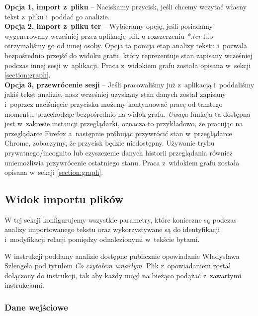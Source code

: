 \documentclass[12pt, a4paper]{article}
\begin{document}
\textbf{Opcja 1, import z~pliku} -- Naciskamy przycisk, jeśli chcemy wczytać własny tekst z~pliku i~poddać go analizie.\\

\noindent\textbf{Opcja 2, import z~pliku ter} -- Wybieramy opcję, jeśli posiadamy wygenerowany wcześniej przez aplikację plik o rozszerzeniu \textit{*.ter} lub otrzymaliśmy go od innej osoby. Opcja ta pomija etap analizy tekstu i~pozwala bezpośrednio przejść do widoku grafu, który reprezentuje stan zapisany wcześniej podczas innej sesji w~aplikacji. Praca z~widokiem grafu została opisana w~sekcji \ref{section:graph}.\\

\noindent\textbf{Opcja 3, przewrócenie sesji} -- Jeśli pracowaliśmy już z~aplikacją i~poddaliśmy jakiś tekst analizie, nasz wcześniej uzyskany stan danych został zapisany i~poprzez naciśnięcie przycisku możemy kontynuować pracę od tamtego momentu, przechodząc bezpośrednio na widok grafu. \textit{Uwaga} funkcja ta dostępna jest w~zakresie instancji przeglądarki, oznacza to przykładowo, że pracując na przeglądarce Firefox a~następnie próbując przywrócić stan w~przeglądarce Chrome, zobaczymy, że przycisk będzie niedostępny. Używanie trybu prywatnego/incognito lub czyszczenie danych historii przeglądania również uniemożliwia przywrócenie ostatniego stanu. Praca z~widokiem grafu została opisana w~sekcji \ref{section:graph}.

\pagebreak

\subsection{Widok importu plików}

W tej sekcji konfigurujemy wszystkie parametry, które konieczne są podczas analizy importowanego tekstu oraz wykorzystywane są do identyfikacji i~modyfikacji relacji pomiędzy odnalezionymi w~tekście bytami.

W instrukcji poddamy analizie dostępne publicznie opowiadanie Władysława Szlengela pod tytułem \textit{Co czytałem umarłym}. Plik z~opowiadaniem został dołączony do instrukcji, tak aby każdy mógł na bieżąco podążać z~zawartymi instrukcjami.

\subsubsection{Dane wejściowe}
\end{document}
